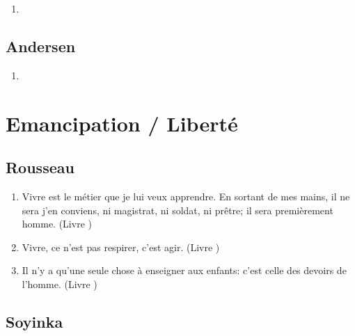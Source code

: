 \documentclass[a4paper, 11pt, hidelinks]{article}
\newcommand{\rb}[1]{\Romanbar{#1}}
\begin{document}
\begin{enumerate}
    \item 
\end{enumerate}




\subsection{Andersen}


\begin{enumerate}
    \item 
\end{enumerate}



























\section{Emancipation / Liberté}



\subsection{Rousseau}


\begin{enumerate}
    \item Vivre est le métier que je lui veux apprendre. En sortant de mes mains, il ne sera j'en conviens, ni magistrat, ni soldat, ni prêtre; il sera premièrement homme. (Livre \rb{1})
    \item Vivre, ce n'est pas respirer, c'est agir. (Livre \rb{1})
    \item Il n'y a qu'une seule chose à enseigner aux enfants: c'est celle des devoirs de l'homme. (Livre \rb{1})
\end{enumerate}



\subsection{Soyinka}
\end{document}
